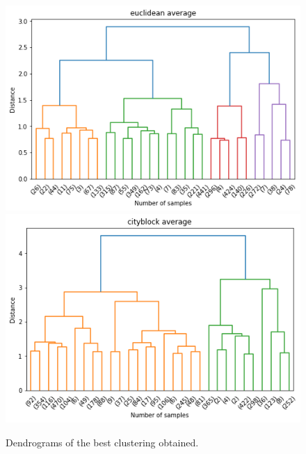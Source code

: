 \documentclass[12pt]{article}
\begin{document}
\begin{figure}[!h]
\centering
{}
    \includegraphics[width=\linewidth]{images/figure_dendr_eucl.png}
\endminipage\hfill
{}
  \includegraphics[width=\linewidth]{images/figure_dendr_manh.png}
\endminipage\hfill
\caption{Dendrograms of the best clustering obtained.}
\label{fig:dendrograms}
\end{figure}
\end{document}
